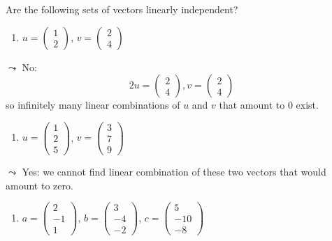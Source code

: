 \documentclass[
  letterpaper,
]{book}
\providecommand{\tightlist}{%
  \setlength{\itemsep}{0pt}\setlength{\parskip}{0pt}}\usepackage{longtable,booktabs,array}
\theoremstyle{definition}
\theoremstyle{definition}
\theoremstyle{plain}
\theoremstyle{definition}
\theoremstyle{plain}
\theoremstyle{plain}
\theoremstyle{remark}
\begin{document}
Are the following sets of vectors linearly independent?

\begin{enumerate}
\def\labelenumi{\arabic{enumi}.}
\tightlist
\item
  \(u = \begin{pmatrix} 1\\ 2\end{pmatrix}\),
  \(v = \begin{pmatrix} 2\\4\end{pmatrix}\)
\end{enumerate}

\(\leadsto\) No:
\[2u = \begin{pmatrix} 2\\ 4\end{pmatrix}, v = \begin{pmatrix} 2\\ 4\end{pmatrix}\]
so infinitely many linear combinations of \(u\) and \(v\) that amount to
0 exist.

\begin{enumerate}
\def\labelenumi{\arabic{enumi}.}
\setcounter{enumi}{1}
\tightlist
\item
  \(u = \begin{pmatrix} 1\\ 2\\ 5 \end{pmatrix}\),
  \(v = \begin{pmatrix} 3\\ 7\\ 9 \end{pmatrix}\)
\end{enumerate}

\(\leadsto\) Yes: we cannot find linear combination of these two vectors
that would amount to zero.

\begin{enumerate}
\def\labelenumi{\arabic{enumi}.}
\setcounter{enumi}{2}
\tightlist
\item
  \(a = \begin{pmatrix} 2\\ -1\\ 1 \end{pmatrix}\),
  \(b = \begin{pmatrix} 3\\ -4\\ -2 \end{pmatrix}\),
  \(c = \begin{pmatrix} 5\\ -10\\ -8 \end{pmatrix}\)
\end{enumerate}
\end{document}
